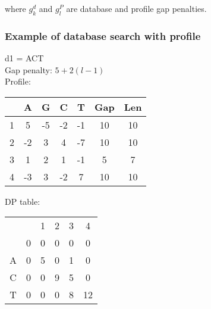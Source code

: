 \bigskip 

\begin{center}
where $g_k^d$ and $g_l^P$ are database and profile gap penalties.
\end{center}

%
%
\subsubsection*{Example of database search with profile}
d1 = ACT \\

\noindent
Gap penalty: $5 + 2(l - 1)$ \\

\noindent
Profile:
\begin{table}[H]
\centering
\begin{tabular}{|c|c|c|c|c|c|c|}
\hline
  & A  & G  & C  & T  & Gap & Len \\ \hline
1 & 5  & -5 & -2 & -1 & 10  & 10  \\ \hline
2 & -2 & 3  & 4  & -7 & 10  & 10  \\ \hline
3 & 1  & 2  & 1  & -1 & 5   & 7   \\ \hline
4 & -3 & 3  & -2 & 7  & 10  & 10  \\ \hline
\end{tabular}
\end{table}

\bigskip 

\noindent
DP table:
\begin{table}[H]
\centering
\begin{tabular}{cccccc}
                       &                        & 1                      & 2                      & 3                      & 4                       \\ \cline{2-6} 
\multicolumn{1}{c|}{}  & \multicolumn{1}{c|}{0} & \multicolumn{1}{c|}{0} & \multicolumn{1}{c|}{0} & \multicolumn{1}{c|}{0} & \multicolumn{1}{c|}{0}  \\ \cline{2-6} 
\multicolumn{1}{c|}{A} & \multicolumn{1}{c|}{0} & \multicolumn{1}{c|}{5} & \multicolumn{1}{c|}{0} & \multicolumn{1}{c|}{1} & \multicolumn{1}{c|}{0}  \\ \cline{2-6} 
\multicolumn{1}{c|}{C} & \multicolumn{1}{c|}{0} & \multicolumn{1}{c|}{0} & \multicolumn{1}{c|}{9} & \multicolumn{1}{c|}{5} & \multicolumn{1}{c|}{0}  \\ \cline{2-6} 
\multicolumn{1}{c|}{T} & \multicolumn{1}{c|}{0} & \multicolumn{1}{c|}{0} & \multicolumn{1}{c|}{0} & \multicolumn{1}{c|}{8} & \multicolumn{1}{c|}{12} \\ \cline{2-6} 
\end{tabular}
\end{table}


